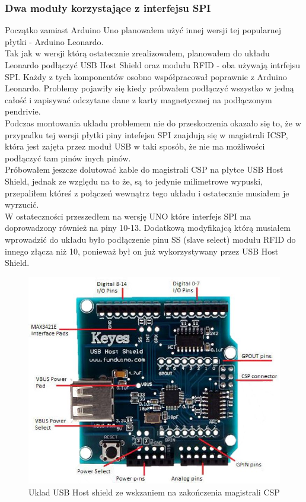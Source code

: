 \documentclass[declaration,shortabstract, mgr]{iithesis}
\begin{document}
\subsubsection{Dwa moduły korzystające z interfejsu SPI}
\indent Początko zamiast Arduino Uno planowałem użyć innej wersji tej popularnej płytki - Arduino Leonardo. \\
\indent Tak jak w wersji którą ostatecznie zrealizowałem, planowałem do układu Leonardo podłączyć USB Host Shield oraz modułu RFID - oba używają intrfejsu SPI. Każdy z tych komponentów osobno współpracował poprawnie z Arduino Leonardo. Problemy pojawiły się kiedy próbwałem podłączyć wszystko w jedną całość i zapisywać odczytane dane z karty magnetycznej na podłączonym pendrivie. \\
\indent Podczas montowania ukladu problemem nie do przeskoczenia okazało się to, że w przypadku tej wersji płytki piny intefejsu SPI znajdują się w magistrali ICSP, która jest zajęta przez moduł USB w taki sposób, że nie ma możliwości podłączyć tam pinów inych pinów. \\
\indent Próbowałem jeszcze dolutować kable do magistrali CSP na płytce  USB Host Shield, jednak ze względu na to że, są to jedynie milimetrowe wypuski, przepaliłem któreś z połączeń wewnątrz tego układu i ostatecznie musiałem je wyrzucić. \\
W ostateczności przeszedłem na wersję UNO które interfejs SPI ma doprowadzony również na piny 10-13. Dodatkową modyfikajcą którą musiałem wprowadzić do układu było podłączenie pinu SS (slave select) modułu RFID do innego złącza niż 10, ponieważ był on już wykorzystywany przez USB Host Shield.
 \begin{figure}[h]
\caption{Uklad USB Host shield ze wskzaniem na zakończenia magistrali CSP}
\centering
\includegraphics[scale=0.6]{usb_host_shield.jpg}
\end{figure}
\end{document}
